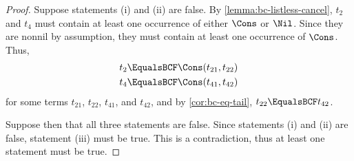 \begin{proof}
    Suppose statements (i) and (ii) are false. By
    \cref{lemma:bc-listless-cancel}, $t_2$ and $t_4$ must contain at least one
    occurrence of either $\Cons$ or $\Nil$. Since they are nonnil by
    assumption, they must contain at least one occurrence of $\Cons$. Thus,
    \begin{align*}
        t_2 &\EqualsBCF \Cons(t_{21}, t_{22}) \\
        t_4 &\EqualsBCF \Cons(t_{41}, t_{42})
    \end{align*}
    for some terms $t_{21}$, $t_{22}$, $t_{41}$, and $t_{42}$, and by
    \cref{cor:bc-eq-tail}, $t_{22} \EqualsBCF t_{42}$.


    Suppose then that all three statements are false. Since statements (i) and
    (ii) are false, statement (iii) must be true. This is a contradiction, thus
    at least one statement must be true.
\end{proof}

